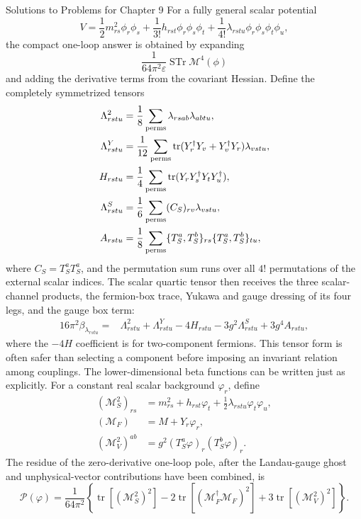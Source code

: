 \begin{bankssolutions}{Solutions to Problems for Chapter 9}
For a fully general scalar potential
\[
 V=\frac12m^2_{rs}\phi_r\phi_s+\frac1{3!}h_{rst}\phi_r\phi_s\phi_t
 +\frac1{4!}\lambda_{rstu}\phi_r\phi_s\phi_t\phi_u,
\]
the compact one-loop answer is obtained by expanding
\[
 \frac{1}{64\pi^2\varepsilon}\operatorname{STr}\mathcal M^4(\phi)
\]
and adding the derivative terms from the covariant Hessian.  Define the
completely symmetrized tensors
\[
\begin{aligned}
 \Lambda^2_{rstu}&=\frac18\sum_{\rm perms}
 \lambda_{rsab}\lambda_{abtu},\\
 \Lambda^Y_{rstu}&=\frac1{12}\sum_{\rm perms}
 \operatorname{tr}(Y_r^\dagger Y_v+Y_v^\dagger Y_r)\lambda_{vstu},\\
 H_{rstu}&=\frac14\sum_{\rm perms}
 \operatorname{tr}(Y_rY_s^\dagger Y_tY_u^\dagger),\\
 \Lambda^S_{rstu}&=\frac16\sum_{\rm perms}
 (C_S)_{rv}\lambda_{vstu},\\
 A_{rstu}&=\frac18\sum_{\rm perms}
 \{T_S^a,T_S^b\}_{rs}\{T_S^a,T_S^b\}_{tu},
\end{aligned}
\]
where $C_S=T_S^aT_S^a$, and the permutation sum runs over all $4!$
permutations of the external scalar indices.  The scalar quartic tensor then
receives the three scalar-channel products, the fermion-box trace, Yukawa and
gauge dressing of its four legs, and the gauge box term:
\begin{align*}
16\pi^2\beta_{\lambda_{rstu}}={}&
 \Lambda^2_{rstu}+\Lambda^Y_{rstu}-4H_{rstu}
 -3g^2\Lambda^S_{rstu}+3g^4 A_{rstu},
\end{align*}
where the $-4H$ coefficient is for two-component fermions.  This tensor form
is often safer than selecting a component before imposing an invariant
relation among couplings.  The lower-dimensional beta functions can be written
just as explicitly.  For a constant real scalar background $\varphi_r$, define
\begin{align*}
 (\mathcal M_S^2)_{rs}&=m^2_{rs}+h_{rst}\varphi_t
       +\frac12\lambda_{rstu}\varphi_t\varphi_u,\\
 (\mathcal M_F)&=M+Y_r\varphi_r,\\
 (\mathcal M_V^2)^{ab}&=g^2(T_S^a\varphi)_r(T_S^b\varphi)_r.
\end{align*}
The residue of the zero-derivative one-loop pole, after the Landau-gauge
ghost and unphysical-vector contributions have been combined, is
\[
 \mathcal P(\varphi)=\frac{1}{64\pi^2}
 \left\{\operatorname{tr}[(\mathcal M_S^2)^2]
 -2\operatorname{tr}[(\mathcal M_F^\dagger\mathcal M_F)^2]
 +3\operatorname{tr}[(\mathcal M_V^2)^2]\right\}.
\]
\end{bankssolutions}
